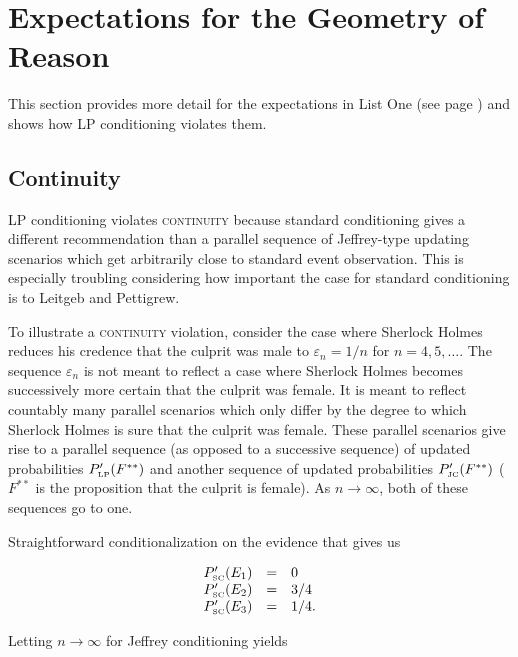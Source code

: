 \documentclass[phd,12pt,oneside]{ubcthesis}
\begin{document}
\section{Expectations for the Geometry of Reason}
\label{sec:ooyaekoo}

This section provides more detail for the expectations in List One
(see page \pageref{page:listone}) and shows how LP conditioning
violates them.

\subsection{Continuity}
\label{subsec:thaoyahc}

LP conditioning violates \textsc{continuity} because standard
conditioning gives a different recommendation than a parallel sequence
of Jeffrey-type updating scenarios which get arbitrarily close to
standard event observation. This is especially troubling considering
how important the case for standard conditioning is to Leitgeb and
Pettigrew.

To illustrate a \textsc{continuity} violation, consider the case where
Sherlock Holmes reduces his credence that the culprit was male to
$\varepsilon_{n}=1/n$ for $n=4,5,\ldots$. The sequence
$\varepsilon_{n}$ is not meant to reflect a case where Sherlock Holmes
becomes successively more certain that the culprit was female. It is
meant to reflect countably many parallel scenarios which only differ
by the degree to which Sherlock Holmes is sure that the culprit was
female. These parallel scenarios give rise to a parallel sequence (as
opposed to a successive sequence) of updated probabilities
$P'_{\mbox{\tiny LP}}(F^{**})$ and another sequence of updated
probabilities $P'_{\mbox{\tiny JC}}(F^{**})$ ($F^{**}$ is the
proposition that the culprit is female). As $n\rightarrow\infty$, both
of these sequences go to one.

Straightforward conditionalization on the evidence that  gives us 

\begin{equation}
  \label{eq:sherlockcontsc}
  \begin{array}{rcl}
  P'_{\mbox{\tiny SC}}(E_{1})&=&0\\
  P'_{\mbox{\tiny SC}}(E_{2})&=&3/4\\
  P'_{\mbox{\tiny SC}}(E_{3})&=&1/4.
\end{array}
\end{equation}

{\noindent}Letting $n\rightarrow\infty$ for Jeffrey conditioning yields
\end{document}
